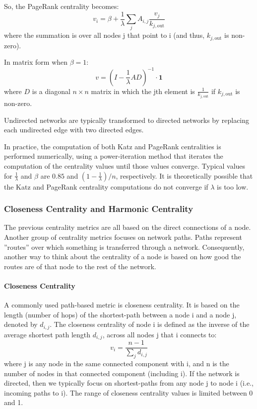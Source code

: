 \documentclass[11pt]{scrartcl} %
\begin{document}
So, the PageRank centrality becomes:
\[ v_i = \beta  + \frac{1}{\lambda} \sum_{j} A_{i,j} \frac{v_j}{k_{j, \text{out}}} \]
where the summation is over all nodes j that point to i (and thus, $k_{j, \text{out}}$ is non-zero).

In matrix form when $\beta=1$:
\[ v = (I - \frac{1}{\lambda}AD)^{-1} \cdot \textbf{1} \]
where $D$ is a diagonal $n\times n$ matrix in which the jth element is $\frac{1}{k_{j, \text{out}}}$ if $k_{j, \text{out}}$ is non-zero.

Undirected networks are typically transformed to directed networks by replacing each undirected edge with two directed edges.

In practice, the computation of both Katz and PageRank centralities is performed numerically, using a power-iteration method that iterates the computation of the centrality values until those values converge. Typical values for $\frac{1}{\lambda}$ and $\beta$ are $0.85$ and $(1 - \frac{1}{\lambda})/n$, respectively. It is theoretically possible that the Katz and PageRank centrality computations do not converge if $\lambda$ is too low.

\subsubsection{Closeness Centrality and Harmonic Centrality}
The previous centrality metrics are all based on the direct connections of a node. Another group of centrality metrics focuses on network paths. Paths represent ”routes” over which something is transferred through a network. Consequently, another way to think about the centrality of a node is based on how good the routes are of that node to the rest of the network.

\paragraph{Closeness Centrality} A commonly used path-based metric is closeness centrality. It is based on the length (number of hops) of the shortest-path between a node i and a node j, denoted by $d_{i,j}$.  The closeness centrality of node i is defined as the inverse of the average shortest path length $d_{i,j}$, across all nodes j that i connects to:
\[ v_i = \frac{n-1}{\sum_j d_{i,j}} \]
where j is any node in the same connected component with i, and n is the number of nodes in that connected component (including i). If the network is directed, then we typically focus on shortest-paths from any node j to node i (i.e., incoming paths to i). The range of closeness centrality values is limited between 0 and 1.
\end{document}
